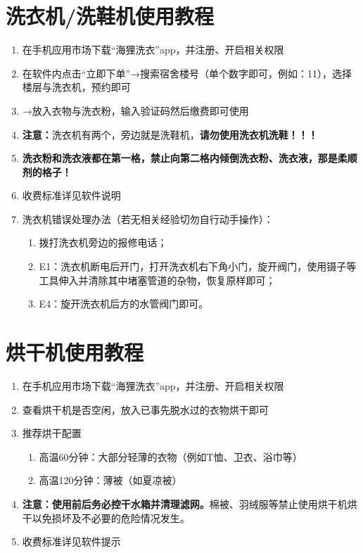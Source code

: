 \section[洗衣机/洗鞋机使用教程]{洗衣机/洗鞋机使用教程}
\label{washing_machine}
\begin{enumerate}
    \item 在手机应用市场下载“海狸洗衣”app，并注册、开启相关权限
    \item 在软件内点击“立即下单”→搜索宿舍楼号（单个数字即可，例如：11），选择楼层与洗衣机，预约即可
    \item →放入衣物与洗衣粉，输入验证码然后缴费即可使用
    \item \textbf{注意：}洗衣机有两个，旁边就是洗鞋机，\textbf{请勿使用洗衣机洗鞋！！！}
    \item \textbf{洗衣粉和洗衣液都在第一格，禁止向第二格内倾倒洗衣粉、洗衣液，那是柔顺剂的格子！}
    \item 收费标准详见软件说明
    \item 洗衣机错误处理办法（若无相关经验切勿自行动手操作）：
          \begin{enumerate}
              \item 拨打洗衣机旁边的报修电话；
              \item E1：洗衣机断电后开门，打开洗衣机右下角小门，旋开阀门，使用镊子等工具伸入并清除其中堵塞管道的杂物，恢复原样即可；
              \item E4：旋开洗衣机后方的水管阀门即可。
          \end{enumerate}
\end{enumerate}

\section[烘干机使用教程]{烘干机使用教程}
\label{dry_machine}
\begin{enumerate}
    \item 在手机应用市场下载“海狸洗衣”app，并注册、开启相关权限
    \item 查看烘干机是否空闲，放入已事先脱水过的衣物烘干即可
    \item 推荐烘干配置
          \begin{enumerate}
              \item 高温60分钟：大部分轻薄的衣物（例如T恤、卫衣、浴巾等）
              \item 高温120分钟：薄被（如夏凉被）
          \end{enumerate}
    \item \textbf{注意：}\textbf{使用前后务必控干水箱并清理滤网。}棉被、羽绒服等禁止使用烘干机烘干以免损坏及不必要的危险情况发生。
    \item 收费标准详见软件提示
\end{enumerate}

